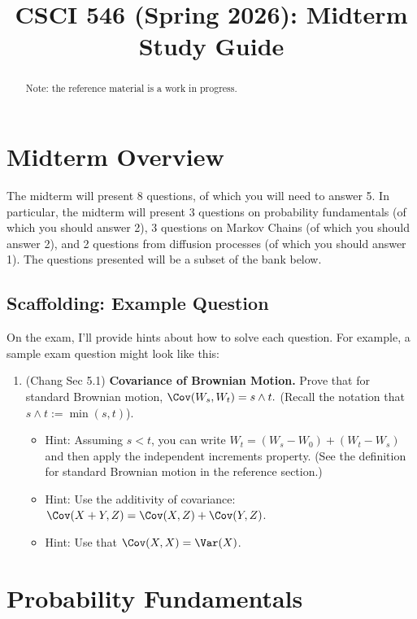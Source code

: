 \documentclass{article} %
\title{CSCI 546 (Spring 2026): Midterm Study Guide}
\begin{document}
\maketitle

\begin{abstract}
Note: the reference material is a work in progress.
\end{abstract}


\section{Midterm Overview}

The midterm will present 8 questions, of which you will need to answer 5.  In particular, the midterm will present 3 questions on probability fundamentals (of which you should answer 2), 3 questions on Markov Chains (of which you should answer 2), and 2 questions from diffusion processes (of which you should answer 1).  The questions presented will be a subset of the bank below.


\subsection{Scaffolding: Example Question}

On the exam, I'll provide hints about how to solve each question.   For example, a sample exam question might look like this:

\begin{enumerate}
	\item (Chang Sec 5.1) \textbf{Covariance of Brownian Motion.}  Prove that for standard Brownian motion, $\Cov(W_s, W_t) = s \wedge t.$ (Recall the notation that $s \wedge t := \min(s,t)$).
	\begin{itemize}
	\item  Hint: Assuming $s<t$, you can write $W_t = (W_s-W_0) + (W_t-W_s)$ and then apply the independent increments property. (See the definition for standard Brownian motion in the reference section.) %
	\item Hint: Use the additivity of covariance: $\Cov(X+Y,Z) = \Cov(X,Z)+\Cov(Y,Z)$.
	\item Hint: Use that $\Cov(X,X)=\Var(X)$.
	\end{itemize}
\end{enumerate}

\section{Probability Fundamentals}
\end{document}
